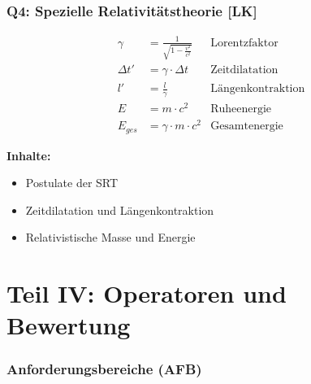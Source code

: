 \documentclass[11pt,a4paper]{article}
\newcommand{\lmark}{\textcolor{accentorange}{\textbf{[LK]}}}
\begin{document}
\section{Q4: Spezielle Relativitätstheorie \lmark{}}

\begin{formelbox}
\begin{align*}
\gamma &= \frac{1}{\sqrt{1 - \frac{v^2}{c^2}}} & \text{Lorentzfaktor} \\
\Delta t' &= \gamma \cdot \Delta t & \text{Zeitdilatation} \\
l' &= \frac{l}{\gamma} & \text{Längenkontraktion} \\
E &= m \cdot c^2 & \text{Ruheenergie} \\
E_{ges} &= \gamma \cdot m \cdot c^2 & \text{Gesamtenergie}
\end{align*}
\end{formelbox}

\textbf{Inhalte:}
\begin{itemize}[leftmargin=0.5cm, itemsep=1pt]
\item Postulate der SRT
\item Zeitdilatation und Längenkontraktion
\item Relativistische Masse und Energie
\end{itemize}

\newpage
\part*{Teil IV: Operatoren und Bewertung}

\section{Anforderungsbereiche (AFB)}
\end{document}
